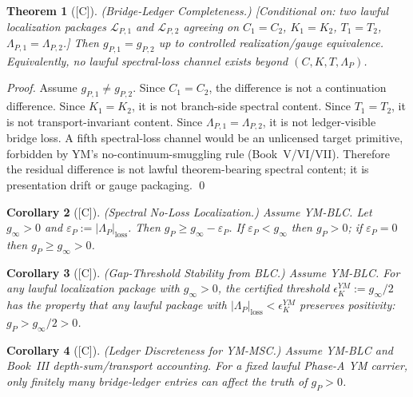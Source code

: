 \documentclass[12pt,oneside]{amsbook}
\theoremstyle{plain}
\newtheorem{theorem}{Theorem}[section]
\newtheorem{corollary}[theorem]{Corollary}
\theoremstyle{definition}
\theoremstyle{remark}
\newcommand{\status}[1]{\textup{[#1]}}
\begin{document}
\begin{theorem}[\status{C}]\label{thm:YM-BLC}
\textup{(Bridge-Ledger Completeness.)}
\textup{[Conditional on: two lawful localization packages
$\mathcal{L}_{P,1}$ and $\mathcal{L}_{P,2}$ agreeing on
$C_1=C_2$, $K_1=K_2$, $T_1=T_2$, $\Lambda_{P,1}=\Lambda_{P,2}$.]}
Then $g_{P,1} = g_{P,2}$ up to controlled realization/gauge
equivalence. Equivalently, no lawful spectral-loss channel exists
beyond $(C, K, T, \Lambda_P)$.
\end{theorem}

\begin{proof}
Assume $g_{P,1} \neq g_{P,2}$. Since $C_1=C_2$, the difference
is not a continuation difference. Since $K_1=K_2$, it is not
branch-side spectral content. Since $T_1=T_2$, it is not
transport-invariant content. Since $\Lambda_{P,1}=\Lambda_{P,2}$,
it is not ledger-visible bridge loss. A fifth spectral-loss channel
would be an unlicensed target primitive, forbidden by YM's
no-continuum-smuggling rule (Book~V/VI/VII). Therefore the residual
difference is not lawful theorem-bearing spectral content; it is
presentation drift or gauge packaging.
\qed
\end{proof}

\begin{corollary}[\status{C}]\label{cor:YM-spectral-no-loss}
\textup{(Spectral No-Loss Localization.)}
Assume YM-BLC. Let $g_\infty > 0$ and
$\varepsilon_P := |\Lambda_P|_{\mathrm{loss}}$. Then
$g_P \ge g_\infty - \varepsilon_P$.
If $\varepsilon_P < g_\infty$ then $g_P > 0$; if $\varepsilon_P = 0$
then $g_P \ge g_\infty > 0$.
\end{corollary}

\begin{corollary}[\status{C}]\label{cor:YM-BLC-gap-threshold}
\textup{(Gap-Threshold Stability from BLC.)}
Assume YM-BLC. For any lawful localization package with
$g_\infty > 0$, the certified threshold
$\epsilon_K^{YM} := g_\infty / 2$
has the property that any lawful package with
$|\Lambda_P|_{\mathrm{loss}} < \epsilon_K^{YM}$
preserves positivity: $g_P > g_\infty / 2 > 0$.
\end{corollary}

\begin{corollary}[\status{C}]\label{cor:YM-BLC-ledger-discreteness}
\textup{(Ledger Discreteness for YM-MSC.)}
Assume YM-BLC and Book~III depth-sum/transport accounting. For a
fixed lawful Phase-A YM carrier, only finitely many bridge-ledger
entries can affect the truth of $g_P > 0$.
\end{corollary}
\end{document}
